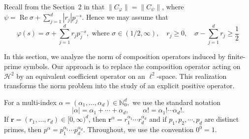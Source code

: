 \documentclass[12pt, reqno]{amsart}
\numberwithin{equation}{section}
\begin{document}
Recall from the Section~2 in \cite{BP1} that $\|C_{\varphi}\|=\|C_{\psi}\|$, where $\psi = \operatorname{Re}\sigma+ \sum_{j=1}^d|r_j|p_j^{-s}.$ Hence we may assume that
\begin{equation}\label{eq:finite-prime symbol}
    \varphi(s)=\sigma+\sum_{j=1}^{d}r_jp_j^{-s},
\text{ where } \sigma\in(1/2, \infty), \quad r_j\ge0, \quad \sigma -\sum_{j=1}^{d}r_j\geq\frac{1}{2}
\end{equation}

In this section, we analyze the
norm of composition operators induced by finite-prime symbols. Our approach is to replace the composition operator acting on $\mathcal{H}^2$ by an equivalent coefficient operator on an $\ell^{2}$-space. This realization transforms the norm problem into the study of an explicit positive operator.

For a multi-index $\alpha=(\alpha_1,\ldots,\alpha_d)\in\mathbb{N}_{0}^{d},$
we use the standard notation
\[
|\alpha|
=
\alpha_1+\cdots+\alpha_d,
\qquad
\alpha!
=
\alpha_1!\cdots\alpha_d!.
\]
If $\boldsymbol{r}=(r_1,\ldots,r_d)\in[0,\infty)^d$,
then
$\boldsymbol{r}^{\alpha}
=
r_1^{\alpha_1}\cdots r_d^{\alpha_d}$ and if $p_1, p_2, \cdots,p_d$ are distinct primes, then $p^{\alpha} = p_1^{\alpha_1}\cdots p_d^{\alpha_d}.$ Throughout, we use the convention $0^0=1.$
\end{document}
